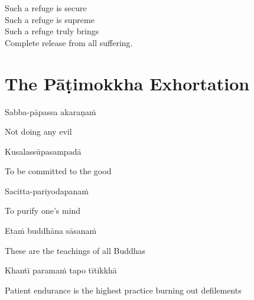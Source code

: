 \begin{english}
  Such a refuge is secure\\
  Such a refuge is supreme\\
  Such a refuge truly brings\\
  Complete release from all suffering.
\end{english}

\suttaRef{[Dhp 188-192]}


\section{The Pāṭimokkha Exhortation}
\label{patimokkha-exhortation}

\begin{leader}
\end{leader}

Sabba-pāpassa akaraṇaṁ

\begin{english}
  Not doing any evil
\end{english}

Kusalassūpasampadā

\begin{english}
  To be committed to the good
\end{english}

Sacitta-pariyodapanaṁ

\begin{english}
  To purify one's mind
\end{english}

Etaṁ buddhāna sāsanaṁ

\begin{english}
  These are the teachings of all Buddhas
\end{english}

Khantī paramaṁ tapo tītikkhā

\begin{english}
  Patient endurance is the highest practice burning out defilements
\end{english}

